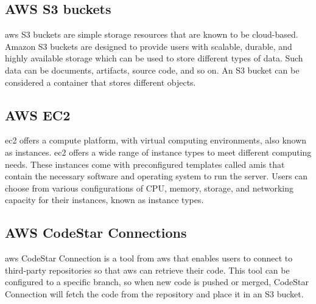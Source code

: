 \subsection{AWS S3 buckets}
\acrshort{aws} S3 buckets are simple storage resources that are known to be cloud-based. Amazon S3 buckets are designed to provide users with scalable, durable, and highly available storage which can be used to store different types of data. Such data can be documents, artifacts, source code, and so on. An S3 bucket can be considered a container that stores different objects. \cite{S3Bucket}

\subsection{AWS EC2}
\acrlong{ec2} offers a \gls{compute platform}, with virtual computing environments, also known as instances. \acrlong{ec2} offers a wide range of instance types to meet different computing needs. These instances come with preconfigured templates called \acrlong{amis} that contain the necessary software and operating system to run the server. Users can choose from various configurations of CPU, memory, storage, and networking capacity for their instances, known as instance types.\cite{awsec2}

\subsection{AWS CodeStar Connections}
\acrshort{aws} CodeStar Connection is a tool from \acrshort{aws} that enables users to connect to third-party repositories so that \acrshort{aws} can retrieve their code. This tool can be configured to a specific branch, so when new code is pushed or merged, CodeStar Connection will fetch the code from the repository and place it in an S3 bucket. 
